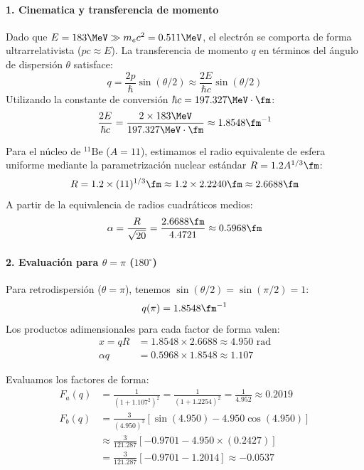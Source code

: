 \begin{problema}
\paragraph{1. Cinematica y transferencia de momento}
Dado que $E = 183 \MeV \gg m_e c^2 = 0.511 \MeV$, el electrón se comporta de forma ultrarrelativista ($p c \approx E$). La transferencia de momento $q$ en términos del ángulo de dispersión $\theta$ satisface:
\begin{equation}
    q = \frac{2p}{\hbar} \sin(\theta/2) \approx \frac{2E}{\hbar c} \sin(\theta/2)
\end{equation}
Utilizando la constante de conversión $\hbar c = 197.327 \MeV \cdot \fm$:
\begin{equation}
    \frac{2E}{\hbar c} = \frac{2 \times 183 \MeV}{197.327 \MeV \cdot \fm} \approx 1.8548 \fm^{-1}
\end{equation}

Para el núcleo de $^{11}\text{Be}$ ($A = 11$), estimamos el radio equivalente de esfera uniforme mediante la parametrización nuclear estándar $R = 1.2 A^{1/3} \fm$:
\begin{equation}
    R = 1.2 \times (11)^{1/3} \fm \approx 1.2 \times 2.2240 \fm \approx 2.6688 \fm
\end{equation}
A partir de la equivalencia de radios cuadráticos medios:
\begin{equation}
    \alpha = \frac{R}{\sqrt{20}} = \frac{2.6688 \fm}{4.4721} \approx 0.5968 \fm
\end{equation}

\paragraph{2. Evaluación para $\theta = \pi$ ($180^\circ$)}
Para retrodispersión ($\theta = \pi$), tenemos $\sin(\theta/2) = \sin(\pi/2) = 1$:
\begin{equation}
    q(\pi) = 1.8548 \fm^{-1}
\end{equation}
Los productos adimensionales para cada factor de forma valen:
\begin{align}
    x = qR &= 1.8548 \times 2.6688 \approx 4.950 \text{ rad} \\
    \alpha q &= 0.5968 \times 1.8548 \approx 1.107
\end{align}

Evaluamos los factores de forma:
\begin{align}
    F_a(q) &= \frac{1}{(1 + 1.107^2)^2} = \frac{1}{(1 + 1.2254)^2} = \frac{1}{4.952} \approx 0.2019 \\
    F_b(q) &= \frac{3}{(4.950)^3} \left[ \sin(4.950) - 4.950 \cos(4.950) \right] \nonumber \\
    &\approx \frac{3}{121.287} \left[ -0.9701 - 4.950 \times (0.2427) \right] \nonumber \\
    &= \frac{3}{121.287} \left[ -0.9701 - 1.2014 \right] \approx -0.0537
\end{align}


\end{problema}
